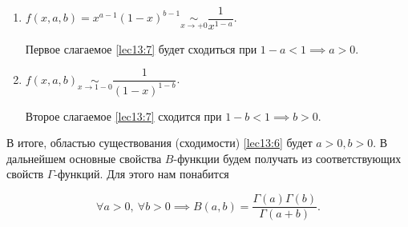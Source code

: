 \documentclass[../../main.tex]{subfiles}
\begin{document}
\begin{enumerate}
 \item $\displaystyle f(x, a, b) = x^{a-1}(1-x)^{b-1} \underset{x\to+0}\sim 
 \dfrac{1}{x^{1-a}}$.
 
  Первое слагаемое \eqref{lec13:7} будет сходиться при $1 - a < 1 \implies a > 
  0$.
  \item $f(x, a, b) \underset{x\to1-0}\sim \dfrac{1}{(1-x)^{1-b}}$.
  
  Второе слагаемое \eqref{lec13:7} сходится при $1-b < 1 \implies b > 0$.
\end{enumerate}

В итоге, областью существования (сходимости) \eqref{lec13:6} будет $a > 0, b > 
0$.
В дальнейшем основные свойства $B$-функции будем получать из соответствующих 
свойств $\Gamma$-функций. Для этого нам понабится

\begin{thm}
	\begin{equation}
	\label{lec13:8}
	\forall a > 0,\ \forall b>0 \implies B(a, b) = 
	\dfrac{\Gamma(a)\Gamma(b)}{\Gamma(a+b)}.
	\end{equation}
\end{thm}
\end{document}
